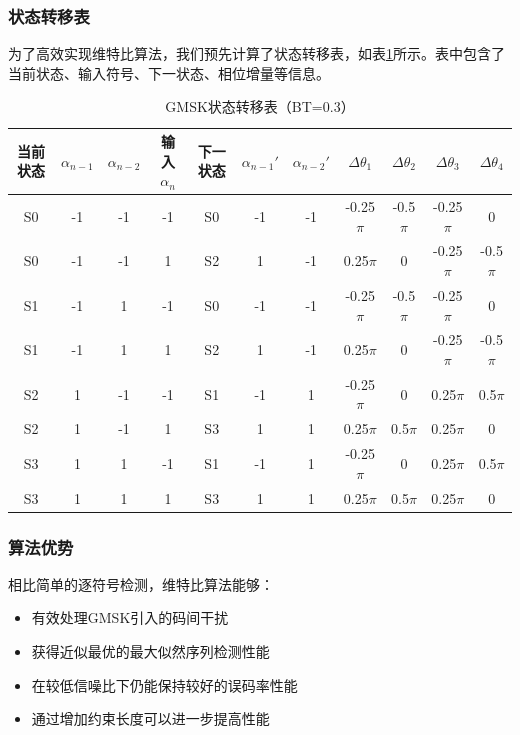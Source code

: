 \documentclass[12pt,a4paper,twoside]{article}
\numberwithin{equation}{section}
\begin{document}
\subsubsection{状态转移表}

为了高效实现维特比算法，我们预先计算了状态转移表，如表\ref{tab:state_transfer}所示。表中包含了当前状态、输入符号、下一状态、相位增量等信息。

\begin{table}[H]
    \centering
    \caption{GMSK状态转移表（BT=0.3）}
    \label{tab:state_transfer}
    \begin{tabular}{ccccccccccc}
    \toprule
    当前状态 & $\alpha_{n-1}$ & $\alpha_{n-2}$ & 输入$\alpha_n$ & 下一状态 & $\alpha_{n-1}'$ & $\alpha_{n-2}'$ & $\Delta\theta_1$ & $\Delta\theta_2$ & $\Delta\theta_3$ & $\Delta\theta_4$ \\
    \midrule
    S0 & -1 & -1 & -1 & S0 & -1 & -1 & -0.25$\pi$ & -0.5$\pi$ & -0.25$\pi$ & 0 \\
    S0 & -1 & -1 & 1 & S2 & 1 & -1 & 0.25$\pi$ & 0 & -0.25$\pi$ & -0.5$\pi$ \\
    S1 & -1 & 1 & -1 & S0 & -1 & -1 & -0.25$\pi$ & -0.5$\pi$ & -0.25$\pi$ & 0 \\
    S1 & -1 & 1 & 1 & S2 & 1 & -1 & 0.25$\pi$ & 0 & -0.25$\pi$ & -0.5$\pi$ \\
    S2 & 1 & -1 & -1 & S1 & -1 & 1 & -0.25$\pi$ & 0 & 0.25$\pi$ & 0.5$\pi$ \\
    S2 & 1 & -1 & 1 & S3 & 1 & 1 & 0.25$\pi$ & 0.5$\pi$ & 0.25$\pi$ & 0 \\
    S3 & 1 & 1 & -1 & S1 & -1 & 1 & -0.25$\pi$ & 0 & 0.25$\pi$ & 0.5$\pi$ \\
    S3 & 1 & 1 & 1 & S3 & 1 & 1 & 0.25$\pi$ & 0.5$\pi$ & 0.25$\pi$ & 0 \\
    \bottomrule
    \end{tabular}
\end{table}

\subsubsection{算法优势}

相比简单的逐符号检测，维特比算法能够：

\begin{itemize}
    \item 有效处理GMSK引入的码间干扰
    \item 获得近似最优的最大似然序列检测性能
    \item 在较低信噪比下仍能保持较好的误码率性能
    \item 通过增加约束长度可以进一步提高性能
\end{itemize}
\end{document}
